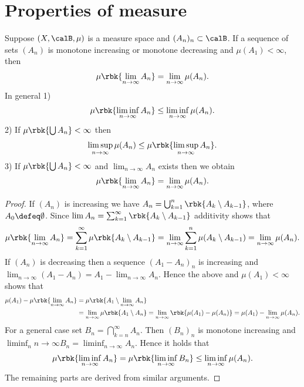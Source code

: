 \documentclass[openany, a4paper, oneside]{jsbook}
\begin{document}
\section{Properties of measure}

\begin{thm}
 Suppose $(X, \calB, \mu)$ is a measure space and $(A_n)_n \subset \calB$.
 If a sequence of sets $(A_n)$ is monotone increasing or monotone decreasing and $\mu (A_1) < \infty$, then
 \begin{align}
  \mu \rbk{\lim_{n \to \infty} A_n} = \lim_{n \to \infty} \mu (A_n).
 \end{align}
 In general
 1) \begin{align}
     \mu \rbk{\liminf_{n \to \infty} A_n} \leq  \liminf_{n \to \infty} \mu (A_n).
    \end{align}
 2) If $\mu \rbk{\bigcup A_n} < \infty$ then
    \begin{align}
     \limsup_{n \to \infty} \mu (A_n) \leq \mu \rbk{\limsup_{n \to \infty} A_n}.
    \end{align}
 3) If $\mu \rbk{\bigcup A_n} < \infty$ and $\lim_{n \to \infty} A_n$ exists then we obtain
    \begin{align}
     \mu \rbk{\lim_{n \to \infty} A_n} = \lim_{n \to \infty} \mu (A_n).
    \end{align}
\end{thm}
\begin{proof}
If $(A_n)$ is increasing we have $A_n = \bigcup_{k=1}^n \rbk{A_k \setminus A_{k-1}}$, where $A_0 \defeq \emptyset$.
Since $\lim A_n = \sum_{k=1}^{\infty} \rbk{A_k \setminus A_{k-1}}$ additivity shows that
\begin{align}
 \mu \rbk{\lim_{n \to \infty} A_n}
 =
 \sum_{k=1}^{\infty} \mu \rbk{A_k \setminus A_{k-1}}
 =
 \lim_{n \to \infty} \sum_{k=1}^n \mu (A_k \setminus A_{k-1})
 =
 \lim_{n \to \infty} \mu (A_n).
\end{align}
If $(A_n)$ is decreasing then a sequence $(A_1 - A_n)_n$ is increasing and $\lim_{n \to \infty} (A_1 - A_n) = A_1 - \lim_{n \to \infty}A_n$.
Hence the above and $\mu (A_1) < \infty$ shows that
\begin{align}
 \mu (A_1) - \mu \rbk{\lim_{n \to \infty} A_n}
 &=
 \mu \rbk{A_1 \setminus \lim_{n \to \infty} A_n} \\
 &=
 \lim_{n \to \infty} \mu \rbk{A_1 \setminus A_n}
 =
 \lim_{n \to \infty} \rbk{\mu (A_1) - \mu (A_n)}
 =
 \mu (A_1) - \lim_{n \to \infty} \mu (A_n).
\end{align}
For a general case set $B_n = \bigcap_{k=n}^{\infty} A_n$.
Then $(B_n)_n$ is monotone increasing and $\liminf_n{n \to \infty} B_n = \liminf_{n \to \infty} A_n$.
Hence it holds that
\begin{align}
 \mu \rbk{\liminf_{n \to \infty} A_n}
 =
 \mu \rbk{\liminf_{n \to \infty} B_n}
 \leq
 \liminf_{n \to \infty} \mu (A_n).
\end{align}
The remaining parts are derived from similar arguments.
\end{proof}
\end{document}
